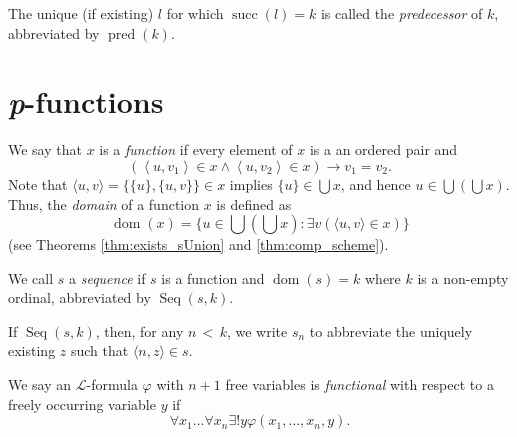 \begin{definition}[Predecessor]
    \label{def:IsOrd.pred}
    \leanok
    The unique (if existing) $l$ for which $\operatorname{succ}(l) = k$ is called the 
    \textit{predecessor} of $k$, abbreviated by $\operatorname{pred}(k)$.
\end{definition}

\section{\textit{p}-functions}

\begin{definition}
    \label{def:IsFunc+IsFunc.dom}
    \leanok
    We say that $x$ is a \textit{function} if every element of $x$ is a an ordered pair and
    $$ 
    \left(\left\langle u, v_1\right\rangle \in x \wedge\left\langle u, v_2\right\rangle 
    \in x\right) \rightarrow v_1=v_2.
    $$
    Note that $\langle u, v\rangle = \{\{u\}, \{u,v\}\} \in x$ implies $\{u\} \in \bigcup x$, and 
    hence $u \in \bigcup\left(\bigcup x\right)$.
    Thus, the \textit{domain} of a function $x$ is defined as
    $$
    \operatorname{dom}(x)=\{u \in \bigcup\left(\bigcup x\right): 
    \exists v(\langle u, v\rangle \in x)\}
    $$
    (see Theorems \ref{thm:exists_sUnion} and \ref{thm:comp_scheme}).
\end{definition}

\begin{definition}[Sequence]
    \label{def:IsSeq}
    \leanok
    We call $s$ a \textit{sequence} if $s$ is a function and $\operatorname{dom}(s)=k$ 
    where $k$ is a non-empty ordinal, abbreviated by $\operatorname{Seq}(s,k)$.

    If $\operatorname{Seq}(s,k)$, then, for any $n\,<\,k$, we write $s_n$ to abbreviate the 
    uniquely existing $z$ such that $\langle n, z\rangle \in s$.
\end{definition}

\begin{definition}[Functional]
    \label{def:IsFunctional}
    \leanok
    We say an $\mathcal{L}$-formula $\varphi$ with $n+1$ free variables is \textit{functional} 
    with respect to a freely occurring variable $y$ if 
    $$
    \forall x_1 \ldots \forall x_n \exists! y  \varphi (x_1,\ldots, x_n, y).
    $$
\end{definition}

